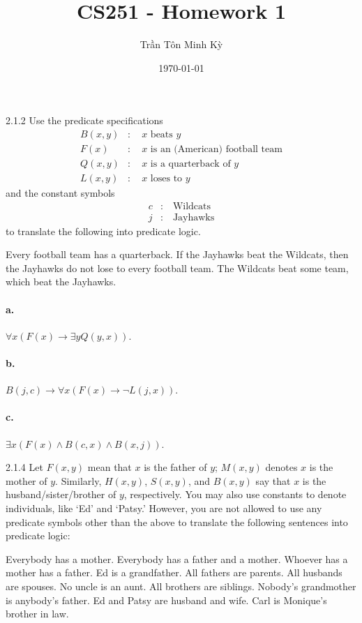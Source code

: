 \documentclass{exam}
\title{CS251 - Homework 1}
\author{\foreignlanguage{vietnamese}{Trần Tôn Minh Kỳ}}
\date{\today}
\begin{document}
\maketitle
\begin{problem}{2.1.2}
Use the predicate specifications
\begin{align*}
	B(x, y) & :\quad \text{$x$ beats $y$} \\
	F(x) & :\quad \text{$x$ is an (American) football team} \\
	Q(x, y) & :\quad \text{$x$ is a quarterback of $y$} \\
	L(x, y) & :\quad \text{$x$ loses to $y$}
\end{align*}
and the constant symbols
\begin{align*}
	c & :\quad \text{Wildcats} \\
	j & :\quad \text{Jayhawks}
\end{align*}
to translate the following into predicate logic.
\begin{tasks}[label=\textbf{\alph*.}]
	\task Every football team has a quarterback.
	\task If the Jayhawks beat the Wildcats, then the Jayhawks do not lose to every football team.
	\task The Wildcats beat some team, which beat the Jayhawks.
\end{tasks}
\end{problem}

\paragraph{a.} $\forall x(F(x) \rightarrow \exists y Q(y, x))$.

\paragraph{b.} $B(j, c) \rightarrow \forall x(F(x) \rightarrow \lnot L(j, x))$.

\paragraph{c.} $\exists x (F(x) \land B(c, x) \land B(x, j))$.

\begin{problem}{2.1.4}
	Let $F(x, y)$ mean that $x$ is the father of $y$; $M(x, y)$ denotes $x$ is the mother of $y$. Similarly, $H(x, y)$, $S(x, y)$, and $B(x, y)$ say that $x$ is the husband/sister/brother of $y$, respectively. You may also use constants to denote individuals, like `Ed' and `Patsy.' However, you are not allowed to use any predicate symbols other than the above to translate the following sentences into predicate logic:
	\begin{tasks}[label=\textbf{\alph*.}]
		\task Everybody has a mother.
		\task Everybody has a father and a mother.
		\task Whoever has a mother has a father.
		\task Ed is a grandfather.
		\task All fathers are parents.
		\task All husbands are spouses.
		\task No uncle is an aunt.
		\task All brothers are siblings.
		\task Nobody's grandmother is anybody's father.
		\task Ed and Patsy are husband and wife.
		\task Carl is Monique's brother in law.
	\end{tasks}
\end{problem}
\end{document}
